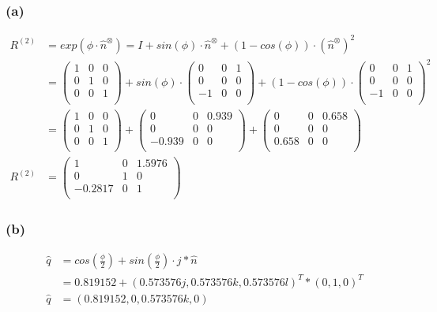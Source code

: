 \documentclass{../Vorlage/mat}
\begin{document}
\subsubsection*{(a)}
\begin{align*}
R^{(2)} & = exp(\phi \cdot \hat{n}^\otimes) = I + sin(\phi) \cdot \hat{n}^\otimes + (1 - cos(\phi)) \cdot (\hat{n}^\otimes)^2\\
& = 
\begin{pmatrix}
1 & 0 & 0 \\
0 & 1 & 0\\
0 & 0 & 1 \\
\end{pmatrix} + sin(\phi) \cdot
\begin{pmatrix}
0 & 0 & 1 \\
0 & 0 & 0 \\
-1 & 0 & 0 \\
\end{pmatrix} + (1 - cos(\phi)) \cdot
\begin{pmatrix}
0 & 0 & 1 \\   
0 & 0 & 0 \\
-1 & 0 & 0 \\
\end{pmatrix}^2 						\\
& = 
\begin{pmatrix}
1 & 0 & 0 \\
0 & 1 & 0\\
0 & 0 & 1 \\
\end{pmatrix} +
\begin{pmatrix}
0 & 0 & 0.939 \\
0 & 0 & 0 \\
-0.939 & 0 & 0 \\
\end{pmatrix} + 
\begin{pmatrix}
0 & 0 & 0.658 \\   
0 & 0 & 0 \\
0.658 & 0 & 0 \\
\end{pmatrix} 						\\
R^{(2)} & =  
\begin{pmatrix}
1 & 0 & 1.5976 \\
0 & 1 & 0\\
-0.2817 & 0 & 1 \\
\end{pmatrix}
\end{align*}
\subsubsection*{(b)}
\begin{align*}
\hat{q} & = cos(\frac{\phi}{2}) + sin(\frac{\phi}{2}) \cdot j * \hat{n}\\
& = 0.819152 + (0.573576j,0.573576k,0.573576l)^T * (0,1,0)^T\\
\hat{q} & = (0.819152, 0, 0.573576k, 0)
\end{align*}
\end{document}
